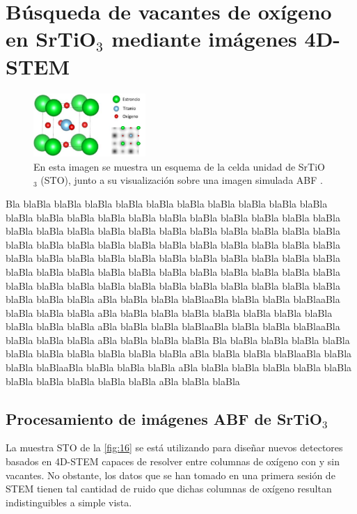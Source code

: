 \section{Búsqueda de vacantes de oxígeno en SrTiO$_3$ mediante imágenes 4D-STEM}

\begin{figure}
    \includegraphics[width=0.38\textwidth]{fig/Fig15.png}
    \caption{En esta imagen se muestra un esquema de la celda unidad de SrTiO$_3$ (STO), junto a su visualización sobre una imagen simulada ABF \cite{paquito}.}
    \label{fig:15}
\end{figure} 


Bla blaBla blaBla blaBla blaBla blaBla blaBla blaBla blaBla blaBla blaBla blaBla blaBla blaBla blaBla blaBla blaBla blaBla blaBla blaBla blaBla blaBla blaBla blaBla blaBla blaBla blaBla blaBla blaBla blaBla blaBla blaBla blaBla blaBla blaBla blaBla blaBla blaBla blaBla blaBla blaBla blaBla blaBla blaBla blaBla blaBla blaBla blaBla blaBla blaBla blaBla blaBla blaBla blaBla blaBla blaBla blaBla blaBla blaBla blaBla blaBla blaBla blaBla blaBla blaBla blaBla blaBla blaBla blaBla blaBla blaBla blaBla blaBla blaBla blaBla blaBla blaBla blaBla blaBla blaBla aBla blaBla blaBla blaBlaaBla blaBla blaBla blaBlaaBla blaBla blaBla blaBla aBla blaBla blaBla blaBla blaBla blaBla blaBla blaBla blaBla blaBla blaBla aBla blaBla blaBla blaBlaaBla blaBla blaBla blaBlaaBla blaBla blaBla blaBla aBla blaBla blaBla blaBla Bla blaBla blaBla blaBla blaBla blaBla blaBla blaBla blaBla blaBla blaBla aBla blaBla blaBla blaBlaaBla blaBla blaBla blaBlaaBla blaBla blaBla blaBla aBla blaBla blaBla blaBla blaBla blaBla blaBla blaBla blaBla blaBla blaBla aBla blaBla blaBla 


\vfill
\subsection{Procesamiento de imágenes ABF de SrTiO$_3$}

La muestra STO de la \autoref{fig:16} se está utilizando para diseñar nuevos detectores basados en 4D-STEM capaces de resolver entre columnas de oxígeno con y sin vacantes. No obstante, los datos que se han tomado en una primera sesión de STEM tienen tal cantidad de ruido que dichas columnas de oxígeno resultan indistinguibles a simple vista.\\


